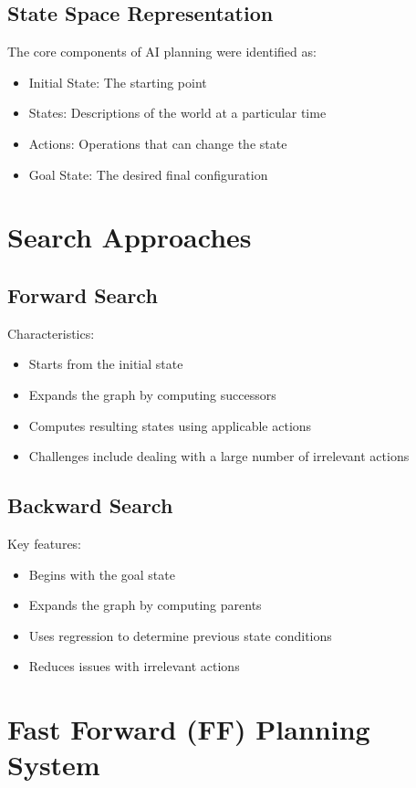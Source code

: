 \documentclass[12pt]{article}
\begin{document}
\subsection{State Space Representation}
The core components of AI planning were identified as:
\begin{itemize}
    \item Initial State: The starting point
    \item States: Descriptions of the world at a particular time
    \item Actions: Operations that can change the state
    \item Goal State: The desired final configuration
\end{itemize}

\section{Search Approaches}

\subsection{Forward Search}
Characteristics:
\begin{itemize}
    \item Starts from the initial state
    \item Expands the graph by computing successors
    \item Computes resulting states using applicable actions
    \item Challenges include dealing with a large number of irrelevant actions
\end{itemize}

\subsection{Backward Search}
Key features:
\begin{itemize}
    \item Begins with the goal state
    \item Expands the graph by computing parents
    \item Uses regression to determine previous state conditions
    \item Reduces issues with irrelevant actions
\end{itemize}

\section{Fast Forward (FF) Planning System}
\end{document}

